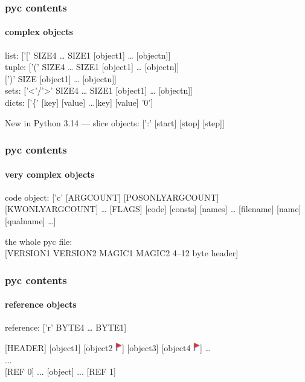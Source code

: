 \documentclass[]{beamer}
\newcommand{\flag}{\includegraphics[height=1em]{images/flag.png}}
\begin{document}
\begin{frame}
  \frametitle{pyc contents}
  \framesubtitle{complex objects}

  \pause

  list: ['[' SIZE4 … SIZE1 [object1] … [objectn]]\\\pause
  tuple: ['(' SIZE4 … SIZE1 [object1] … [objectn]]\\\pause
  \phantom{tuple:} [')' SIZE [object1] … [objectn]]\\\pause
  sets: ['<'/'>' SIZE4 … SIZE1 [object1] … [objectn]]\\\pause
  dicts: ['\{' [key] [value] ...[key] [value] '0']\\\pause

  New in Python 3.14 — slice objects: [':' [start] [stop] [step]]
\end{frame}

\begin{frame}
  \frametitle{pyc contents}
  \framesubtitle{very complex objects}

  \pause

  code object: ['c' [ARGCOUNT] [POSONLYARGCOUNT] [KWONLYARGCOUNT] … [FLAGS] [code] [consts] [names] … [filename] [name] [qualname] …]
  \\\pause

  the whole pyc file:\\{}
  [VERSION1 VERSION2 MAGIC1 MAGIC2 4–12 byte header]\\
\end{frame}



\begin{frame}
  \frametitle{pyc contents}
  \framesubtitle{reference objects}

  \pause

  reference: ['r' BYTE4 … BYTE1]

  \vfill
  \pause

  [HEADER] [object1] [object2 \flag] [object3] [object4 \flag] … \\{}
  ...\\\pause
  {}[REF 0] ... [object] ... [REF 1]
\end{frame}
\end{document}

